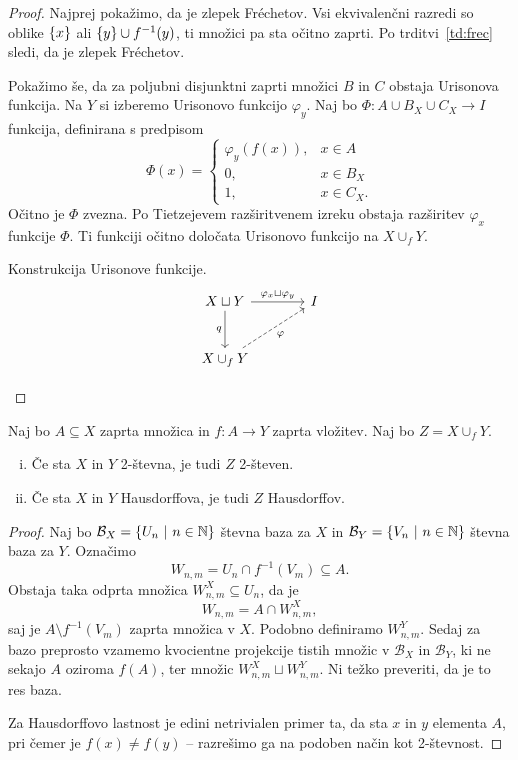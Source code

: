 \begin{proof}
Najprej pokažimo, da je zlepek Fréchetov. Vsi ekvivalenčni razredi
so oblike $\left\{x\right\}$ ali $\left\{y\right\} \cup f^{-1}(y)$, ti množici pa sta
očitno zaprti. Po trditvi~\ref{td:frec} sledi, da je zlepek
Fréchetov.

Pokažimo še, da za poljubni disjunktni zaprti množici $B$ in $C$
obstaja Urisonova funkcija. Na $Y$ si izberemo Urisonovo funkcijo
$\varphi_y$. Naj bo $\Phi \colon A \cup B_X \cup C_X \to I$
funkcija, definirana s predpisom
\[
\Phi(x) =
\begin{cases}
\varphi_y(f(x)), & x \in A \\
0,               & x \in B_X \\
1,               & x \in C_X.
\end{cases}
\]
Očitno je $\Phi$ zvezna. Po Tietzejevem razširitvenem izreku
obstaja razširitev $\varphi_x$ funkcije $\Phi$. Ti funkciji očitno
določata Urisonovo funkcijo na $X \cup_f Y$.

\begin{skica}{Konstrukcija Urisonove funkcije.}
\[
\begin{tikzcd}[column sep=large, row sep=large]
X \sqcup Y
\arrow[r, "\varphi_x \sqcup \varphi_y"]
\arrow[d, "q"']
& I \\
X \cup_f Y \arrow[ur, dashrightarrow, "\varphi"'] &
\end{tikzcd} \qedhere
\]
\end{skica}
\end{proof}

\begin{trditev}\label{td:zlp}
Naj bo $A \subseteq X$ zaprta množica in $f \colon A \to Y$ zaprta
vložitev. Naj bo $Z = X \cup_f Y$.

\begin{enumerate}[i)]
\item Če sta $X$ in $Y$ 2-števna, je tudi $Z$ 2-števen.
\item Če sta $X$ in $Y$ Hausdorffova, je tudi $Z$ Hausdorffov.
\end{enumerate}
\end{trditev}

\begin{proof}
Naj bo $\mathcal{B}_X = \left\{U_n~\middle\vert~n \in \mathbb{N}\right\}$ števna baza za $X$ in
$\mathcal{B}_Y = \left\{V_n~\middle\vert~n \in \mathbb{N}\right\}$ števna baza za $Y$. Označimo
\[
W_{n,m} = U_n \cap f^{-1}(V_m) \subseteq A.
\]
Obstaja taka odprta množica $W_{n,m}^X \subseteq U_n$, da je
\[
W_{n,m} = A \cap W_{n,m}^X,
\]
saj je $A \setminus f^{-1}(V_m)$ zaprta množica v $X$. Podobno
definiramo $W_{n,m}^Y$. Sedaj za bazo preprosto vzamemo kvocientne
projekcije tistih množic v $\mathcal{B}_X$ in $\mathcal{B}_Y$, ki
ne sekajo $A$ oziroma $f(A)$, ter množic
$W_{n,m}^X \sqcup W_{n,m}^Y$. Ni težko preveriti, da je to res
baza.

Za Hausdorffovo lastnost je edini netrivialen primer ta, da sta
$x$ in $y$ elementa $A$, pri čemer je $f(x) \ne f(y)$ -- razrešimo
ga na podoben način kot 2-števnost.
\end{proof}

